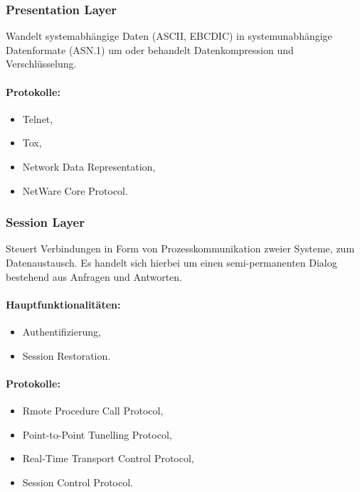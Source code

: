 \documentclass{scrartcl}
\begin{document}
    \subsubsection{Presentation Layer}
    \label{OSI:presentation_layer}
    Wandelt systemabhängige Daten (ASCII, EBCDIC) in systemunabhängige Datenformate (ASN.1) um oder behandelt Datenkompression und Verschlüsselung.
    
    \paragraph{Protokolle:}
    \begin{itemize}
        \item Telnet,
        \item Tox,
        \item Network Data Representation,
        \item NetWare Core Protocol.
    \end{itemize}

    \subsubsection{Session Layer}
    \label{OSI:session_layer}
    Steuert Verbindungen in Form von Prozesskommunikation zweier Systeme, zum Datenaustausch. 
    Es handelt sich hierbei um einen semi-permanenten Dialog bestehend aus Anfragen und Antworten.

    \paragraph{Hauptfunktionalitäten:}
    \begin{itemize}
        \item Authentifizierung,
        \item Session Restoration.
    \end{itemize}

    \paragraph{Protokolle:}
    \begin{itemize}
        \item Rmote Procedure Call Protocol,
        \item Point-to-Point Tunelling Protocol,
        \item Real-Time Transport Control Protocol, 
        \item Session Control Protocol.
    \end{itemize}
\end{document}
